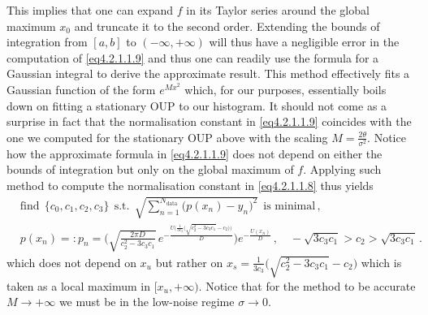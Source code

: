 \documentclass[../main.tex]{subfiles}
\begin{document}
This implies that one can expand $f$ in its Taylor series around the global maximum $x_{0}$ and truncate it to the second order.
Extending the bounds of integration from $[a,b]$ to $(-\infty,+\infty)$ will thus have a negligible error in the computation of \eqref{eq4.2.1.1.9} and thus one can readily use the formula for a Gaussian integral to derive the approximate result.
This method effectively fits a Gaussian function of the form $e^{Mx^{2}}$ which, for our purposes, essentially boils down on fitting a stationary OUP to our histogram.
It should not come as a surprise in fact that the normalisation constant in \eqref{eq4.2.1.1.9} coincides with the one we computed for the stationary OUP above with the scaling $M=\frac{2\theta}{\sigma^{2}}$.
Notice how the approximate formula in \eqref{eq4.2.1.1.9} does not depend on either the bounds of integration but only on the global maximum of $f$.
Applying such method to compute the normalisation constant in \eqref{eq4.2.1.1.8} thus yields
\begin{align}
     &\text{find}\;\,\{c_{0},c_{1},c_{2},c_{3}\}\;\,\text{s.t.}\;\,\sqrt{\sum_{n=1}^{N_{\text{data}}}\big(p(x_{n}) - y_{n}\big)^{2}}\;\,\text{is minimal}\,, \label{eq4.2.1.1.10} \\
     &p(x_{n}) =: p_{n} = \Bigg(\sqrt{\frac{2\pi D}{c_{2}^{2}-3c_{3}c_{1}}}\,e^{-\frac{U\Big(\frac{1}{3c_{3}}\big(\sqrt{c_{2}^{2}-3 c_{3}c_{1}}-c_{2}\big)\Big)}{D}}\Bigg)e^{-\frac{U(x_{n})}{D}}\,,\quad -\sqrt{3c_{3}c_{1}}>c_{2}>\sqrt{3c_{3}c_{1}}\,.\nonumber
\end{align}
which does not depend on $x_{u}$ but rather on $x_{s} = \frac{1}{3c_{3}}\Big(\sqrt{c_{2}^{2}-3 c_{3}c_{1}}-c_{2}\Big)$ which is taken as a local maximum in $[x_{u},+\infty)$.
Notice that for the method to be accurate $M\to+\infty$ we must be in the low-noise regime $\sigma\to0$.
\printbibliography
\end{document}
